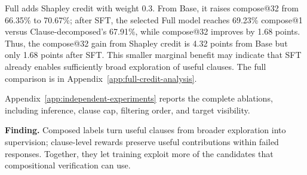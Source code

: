 Full adds Shapley credit with weight 0.3.  From Base, it raises compose@32
from 66.35\% to 70.67\%; after SFT, the selected Full model reaches
69.23\% compose@1 versus Clause-decomposed's 67.91\%, while compose@32 improves by
1.68 points.  Thus, the compose@32 gain from Shapley credit is 4.32 points
from Base but only 1.68 points after SFT.  This smaller marginal benefit may
indicate that SFT already enables sufficiently broad exploration of useful
clauses.  The full comparison is in Appendix~\ref{app:full-credit-analysis}.

\label{sec:exp:probe}
Appendix~\ref{app:independent-experiments} reports the complete ablations,
including inference, clause cap, filtering order,
and target visibility.

\begin{insightbox}
\textbf{Finding.}
Composed labels turn useful clauses from broader exploration into supervision;
clause-level rewards preserve useful contributions within failed responses.
Together, they let training exploit more of the candidates that compositional
verification can use.
\end{insightbox}
